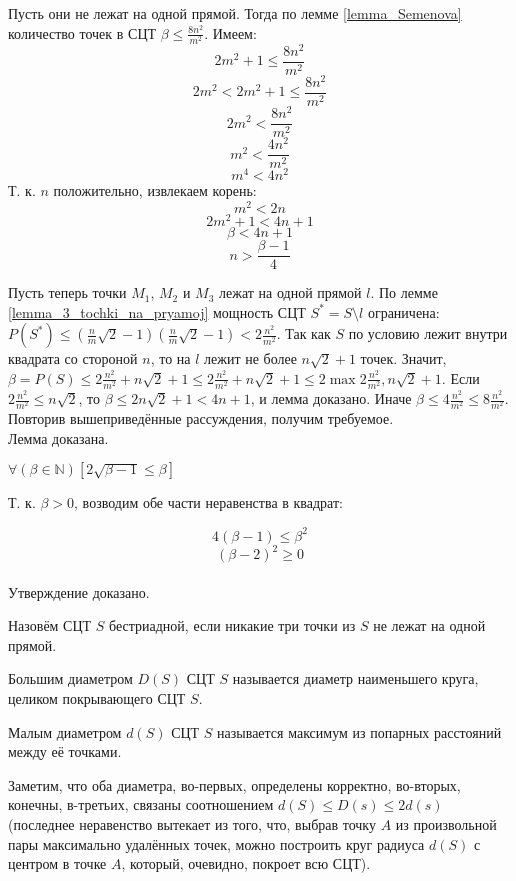 	Пусть они не лежат на одной прямой.
		Тогда по лемме \ref{lemma_Semenova} количество точек в СЦТ $\beta \leq \frac{8n^2}{m^2}$.
		Имеем:
		$$ 2m^2+1 \le \frac{8n^2}{m^2}$$
		$$ 2m^2 < 2m^2+1 \le \frac{8n^2}{m^2}$$
		$$ 2m^2 < \frac{8n^2}{m^2}$$
		$$ m^2 < \frac{4n^2}{m^2}$$
		$$ m^4 < 4n^2$$
		Т. к. $n$ положительно, извлекаем корень:
		$$ m^2 < 2n$$
		$$ 2m^2 +1 < 4n + 1$$
		$$ \beta < 4n + 1$$
		$$n > \frac{\beta - 1}{4}$$

	Пусть теперь точки $M_1$, $M_2$ и $M_3$ лежат на одной прямой $l$.
		По лемме \ref{lemma_3_tochki_na_pryamoj} мощность СЦТ $S^*=S \setminus l$ ограничена:
		$P(S^*) \leq \left( \frac{n}{m}\sqrt{2} - 1 \right)\left( \frac{n}{m}\sqrt{2} - 1 \right) < 2\frac{n^2}{m^2}$.
		Так как $S$ по условию лежит внутри квадрата со стороной $n$, то на $l$ лежит не более $n\sqrt{2} + 1$ точек.
		Значит,
		$\beta = P(S) \leq 2\frac{n^2}{m^2} + n\sqrt{2} + 1 \leq 2\frac{n^2}{m^2} + n\sqrt{2} + 1 \leq 2\max{2\frac{n^2}{m^2}, n\sqrt{2}}+1$.
		Если $2\frac{n^2}{m^2} \leq n\sqrt{2}$, то $\beta \leq 2n\sqrt{2}+1 < 4n+1$,
		и лемма доказано.
		Иначе $\beta \leq 4\frac{n^2}{m^2}  \leq 8\frac{n^2}{m^2}$.
		Повторив вышеприведённые рассуждения, получим требуемое.
\\ Лемма доказана.


\begin{utverzhd}[вспомогательное]
	$\forall \left(\beta \in \mathbb N\right)\left[  2 \sqrt{\beta - 1} \leq \beta \right]$
\end{utverzhd}

\dokvo
	Т. к. $\beta >0$, возводим обе части неравенства в квадрат:

	$$4 (\beta - 1) \leq \beta^2$$
	$$ (\beta-2)^2 \geq 0$$
\\ Утверждение доказано.

\begin{opr}
	Назовём СЦТ $S$ бестриадной, если никакие три точки из $S$ не лежат на одной прямой.
\end{opr}

\begin{opr}
	Большим диаметром $D(S)$ СЦТ $S$ называется диаметр наименьшего круга, целиком покрывающего СЦТ $S$.
\end{opr}

\begin{opr}
	Малым диаметром $d(S)$ СЦТ $S$ называется максимум из попарных расстояний между её точками.
\end{opr}

Заметим, что оба диаметра, во-первых, определены корректно, во-вторых, конечны, в-третьих, связаны соотношением $d(S)\leq D(s) \leq 2d(s)$ (последнее неравенство вытекает из того, что, выбрав точку $A$ из произвольной пары максимально удалённых точек, можно построить круг радиуса $d(S)$ с центром в точке $A$, который, очевидно, покроет всю СЦТ).


